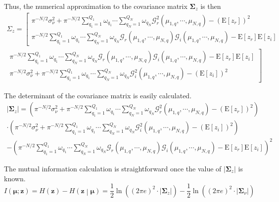 \documentclass{article}         %
\theoremstyle{definition}
\theoremstyle{remark}
\newcommand{\eq}[1]{\begin{equation} #1 \end{equation}}
\newcommand{\ml}[1]{\begin{multline} #1 \end{multline}}
\newcommand{\zbf}{\mathbf{z}}
\newcommand{\mubf}{\boldsymbol{\mu}}
\newcommand{\Sigmabf}{\boldsymbol{\Sigma}}
\newcommand{\Gscript}{\mathcal{G}}
\newcommand{\paren}[1]{\left(#1\right)}
\newcommand{\arr}[2]{\begin{array}{#1} #2 \end{array}}
\newcommand{\expect}[1]{\mathrm{E}\left[#1\right]}
\newcommand{\sumqone}{\sum\limits_{q_1=1}^{Q_1}}
\newcommand{\sumqN}{\sum\limits_{q_N=1}^{Q_N}}
\begin{document}

Thus, the numerical approximation to the covariance matrix $\Sigmabf_z$ is then
\ml{\Sigma_z = \left[\arr{c}{\pi^{-N/2}\sigma_\nu^2+\pi^{-N/2}\sumqone\omega_{q_1}\cdots\sumqN\omega_{q_N}\Gscript_r^2\paren{\mu_{1,q},\cdots,\mu_{N,q}}-\paren{\expect{z_r}}^2 \\ \pi^{-N/2}\sumqone\omega_{q_1}\cdots\sumqN\omega_{q_N}\Gscript_r\paren{\mu_{1,q},\cdots,\mu_{N,q}}\Gscript_i\paren{\mu_{1,q},\cdots,\mu_{N,q}}-\expect{z_r}\expect{z_i}}\right. \\ \left.\arr{c}{\pi^{-N/2}\sumqone\omega_{q_1}\cdots\sumqN\omega_{q_N}\Gscript_r\paren{\mu_{1,q},\cdots,\mu_{N,q}}\Gscript_i\paren{\mu_{1,q},\cdots,\mu_{N,q}}-\expect{z_r}\expect{z_i} \\ \pi^{-N/2}\sigma_\nu^2+\pi^{-N/2}\sumqone\omega_{q_1}\cdots\sumqN\omega_{q_N}\Gscript_i^2\paren{\mu_{1,q},\cdots,\mu_{N,q}}-\paren{\expect{z_i}}^2}\right]}

The determinant of the covariance matrix is easily calculated.
\ml{\lvert\Sigmabf_z\rvert = \paren{\pi^{-N/2}\sigma_\nu^2+\pi^{-N/2}\sumqone\omega_{q_1}\cdots\sumqN\omega_{q_N}\Gscript_r^2\paren{\mu_{1,q},\cdots,\mu_{N,q}}-\paren{\expect{z_r}}^2} \\
\cdot\paren{\pi^{-N/2}\sigma_\nu^2+\pi^{-N/2}\sumqone\omega_{q_1}\cdots\sumqN\omega_{q_N}\Gscript_i^2\paren{\mu_{1,q},\cdots,\mu_{N,q}}-\paren{\expect{z_i}}^2} \\
-\paren{\pi^{-N/2}\sumqone\omega_{q_1}\cdots\sumqN\omega_{q_N}\Gscript_r\paren{\mu_{1,q},\cdots,\mu_{N,q}}\Gscript_i\paren{\mu_{1,q},\cdots,\mu_{N,q}}-\expect{z_r}\expect{z_i}}^2}

The mutual information calculation is straightforward once the value of $\lvert\Sigmabf_z\rvert$ is known.
\eq{I\paren{\mubf;\zbf} = H\paren{\zbf} - H\paren{\zbf\middle|\mubf} = \frac{1}{2}\ln\paren{\paren{2\pi e}^2\cdot\lvert\Sigmabf_z\rvert}-\frac{1}{2}\ln\paren{\paren{2\pi e}^2\cdot\lvert\Sigmabf_\nu\rvert}}
\end{document}
